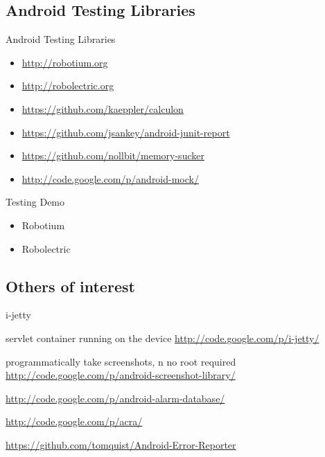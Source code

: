 \documentclass[aspectratio=169]{beamer}
\newcommand{\surl}[1] {{\tiny \url{#1}}}
\begin{document}
  \subsection{Android Testing Libraries}

    \begin{frame}{Android Testing Libraries}
      \begin{itemize}
        \item<1->[Robotium] \surl{http://robotium.org}
        \item<2->[Robolectric] \surl{http://robolectric.org}
        \item<3->[Calculon] \surl{https://github.com/kaeppler/calculon}
        \item<4->[Android JUnit Report] \surl{https://github.com/jsankey/android-junit-report}
        \item<5->[Memory Sucker] \surl{https://github.com/nollbit/memory-sucker}
        \item<6->[Android Mock] \surl{http://code.google.com/p/android-mock/}
      \end{itemize}
    \end{frame}

    \begin{frame}{Testing Demo}
      \begin{itemize}
       \item Robotium
       \item Robolectric
      \end{itemize}
    \end{frame}

  \subsection{Others of interest}  

    \begin{frame}{i-jetty}
      \begin{description}
       \item<1->[i-jetty] servlet container running on the device \surl{http://code.google.com/p/i-jetty/}
        \item<2->[Android Screenshot library] programmatically take screenshots, n no root required \surl{http://code.google.com/p/android-screenshot-library/}
        \item<3->[Android Alarm Database] \surl{http://code.google.com/p/android-alarm-database/}
        \item<4->[Application Crash Report for Android ACRA] \surl{http://code.google.com/p/acra/}
        \item<5->[Android Error Reporter] \surl{https://github.com/tomquist/Android-Error-Reporter}
      \end{description}
    \end{frame}
\end{document}
